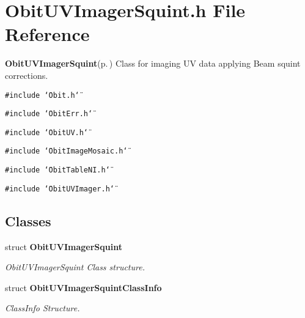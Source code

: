 \section{Obit\-UVImager\-Squint.h File Reference}
\label{ObitUVImagerSquint_8h}
{\bf Obit\-UVImager\-Squint}{\rm (p.\,\pageref{structObitUVImagerSquint})} Class for imaging UV data applying Beam squint corrections. 

{\tt \#include \char`\"{}Obit.h\char`\"{}}\par
{\tt \#include \char`\"{}Obit\-Err.h\char`\"{}}\par
{\tt \#include \char`\"{}Obit\-UV.h\char`\"{}}\par
{\tt \#include \char`\"{}Obit\-Image\-Mosaic.h\char`\"{}}\par
{\tt \#include \char`\"{}Obit\-Table\-NI.h\char`\"{}}\par
{\tt \#include \char`\"{}Obit\-UVImager.h\char`\"{}}\par
\subsection*{Classes}
\begin{CompactItemize}
\item 
struct {\bf Obit\-UVImager\-Squint}
\begin{CompactList}\small\item\em Obit\-UVImager\-Squint Class structure. \item\end{CompactList}\item 
struct {\bf Obit\-UVImager\-Squint\-Class\-Info}
\begin{CompactList}\small\item\em Class\-Info Structure. \item\end{CompactList}\end{CompactItemize}
